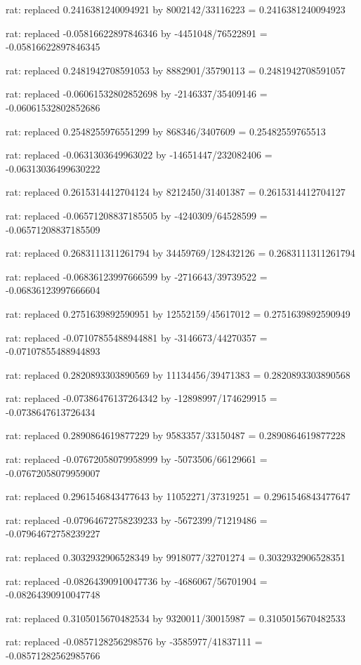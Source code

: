 \documentclass[a4paper,10pt]{article}
\begin{document}
\begin{eulernotebook}
\begin{eulercomment}
\begin{eulercomment}
\begin{eulercomment}
\begin{eulercomment}
\begin{eulercomment}
\begin{eulercomment}
\begin{eulercomment}
\begin{eulercomment}
\begin{eulercomment}
\begin{eulercomment}
\begin{eulercomment}
\begin{eulercomment}
\begin{eulercomment}
\begin{eulercomment}
\begin{eulercomment}
\begin{eulercomment}
\begin{euleroutput}
  rat: replaced 0.2416381240094921 by 8002142/33116223 = 0.2416381240094923
  
  rat: replaced -0.05816622897846346 by -4451048/76522891 = -0.05816622897846345
  
  rat: replaced 0.2481942708591053 by 8882901/35790113 = 0.2481942708591057
  
  rat: replaced -0.06061532802852698 by -2146337/35409146 = -0.06061532802852686
  
  rat: replaced 0.2548255976551299 by 868346/3407609 = 0.25482559765513
  
  rat: replaced -0.0631303649963022 by -14651447/232082406 = -0.06313036499630222
  
  rat: replaced 0.2615314412704124 by 8212450/31401387 = 0.2615314412704127
  
  rat: replaced -0.06571208837185505 by -4240309/64528599 = -0.06571208837185509
  
  rat: replaced 0.2683111311261794 by 34459769/128432126 = 0.2683111311261794
  
  rat: replaced -0.06836123997666599 by -2716643/39739522 = -0.06836123997666604
  
  rat: replaced 0.2751639892590951 by 12552159/45617012 = 0.2751639892590949
  
  rat: replaced -0.07107855488944881 by -3146673/44270357 = -0.07107855488944893
  
  rat: replaced 0.2820893303890569 by 11134456/39471383 = 0.2820893303890568
  
  rat: replaced -0.07386476137264342 by -12898997/174629915 = -0.0738647613726434
  
  rat: replaced 0.2890864619877229 by 9583357/33150487 = 0.2890864619877228
  
  rat: replaced -0.07672058079958999 by -5073506/66129661 = -0.07672058079959007
  
  rat: replaced 0.2961546843477643 by 11052271/37319251 = 0.2961546843477647
  
  rat: replaced -0.07964672758239233 by -5672399/71219486 = -0.07964672758239227
  
  rat: replaced 0.3032932906528349 by 9918077/32701274 = 0.3032932906528351
  
  rat: replaced -0.08264390910047736 by -4686067/56701904 = -0.08264390910047748
  
  rat: replaced 0.3105015670482534 by 9320011/30015987 = 0.3105015670482533
  
  rat: replaced -0.0857128256298576 by -3585977/41837111 = -0.08571282562985766
  

\end{euleroutput}
\end{eulercomment}
\end{eulercomment}
\end{eulercomment}
\end{eulercomment}
\end{eulercomment}
\end{eulercomment}
\end{eulercomment}
\end{eulercomment}
\end{eulercomment}
\end{eulercomment}
\end{eulercomment}
\end{eulercomment}
\end{eulercomment}
\end{eulercomment}
\end{eulercomment}
\end{eulercomment}
\end{eulernotebook}
\end{document}
